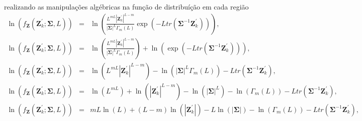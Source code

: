 \documentclass[12pt,a4paper]{article}
\begin{document}
realizando as manipulações algébricas na função de distribuíção em cada região
\begin{equation*}
\begin{array}{ccc}
	\ln{\left(f_{\mathbf{Z}}(\mathbf{Z}_{k}^{'};\mathbf{\Sigma},L)\right)}&=&\ln{\left(\frac{L^{mL}|\mathbf{Z}_{k}^{'}|^{L-m}}{|\mathbf{\Sigma}|^{L}\Gamma_m(L)} \exp(-L tr(\mathbf{\Sigma}^{-1}\mathbf{Z}_{k}^{'}))\right)}, \\
	\ln{\left(f_{\mathbf{Z}}(\mathbf{Z}_{k}^{'};\mathbf{\Sigma},L)\right)}&=&\ln{\left(\frac{L^{mL}|\mathbf{Z}_{k}^{'}|^{L-m}}{|\mathbf{\Sigma}|^{L}\Gamma_m(L)}\right)}+\ln{\left(\exp(-L tr(\mathbf{\Sigma}^{-1}\mathbf{Z}_{k}^{'}))\right)}, \\
	\ln{\left(f_{\mathbf{Z}}(\mathbf{Z}_{k}^{'};\mathbf{\Sigma},L)\right)}&=&\ln{\left(L^{mL}|\mathbf{Z}_{k}^{'}|^{L-m}\right)}- \ln{\left(|\mathbf{\Sigma}|^{L}\Gamma_m(L)\right)}-L tr(\mathbf{\Sigma}^{-1}\mathbf{Z}_{k}^{'}), \\
	\ln{\left(f_{\mathbf{Z}}(\mathbf{Z}_{k}^{'};\mathbf{\Sigma},L)\right)}&=&\ln{\left(L^{mL}\right)}+\ln{\left(|\mathbf{Z}_{k}^{'}|^{L-m}\right)}- \ln{\left(|\mathbf{\Sigma}|^{L}\right)}-\ln{\left(\Gamma_m(L)\right)}-L tr(\mathbf{\Sigma}^{-1}\mathbf{Z}_{k}^{'}), \\
	\ln{\left(f_{\mathbf{Z}}(\mathbf{Z}_{k}^{'};\mathbf{\Sigma},L)\right)}&=&mL\ln{\left(L\right)}+(L-m)\ln{\left(|\mathbf{Z}_{k}^{'}|\right)}- L\ln{\left(|\mathbf{\Sigma}|\right)}-\ln{\left(\Gamma_m(L)\right)}-L tr(\mathbf{\Sigma}^{-1}\mathbf{Z}_{k}^{'}), \\
\end{array}
\end{equation*}
\end{document}
